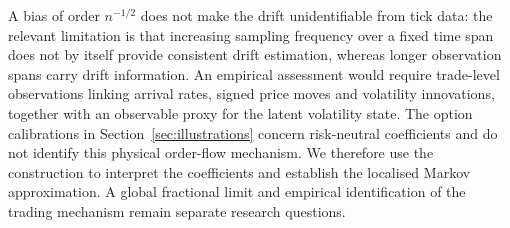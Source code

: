 \documentclass[11pt,a4paper]{article}
\theoremstyle{definition}
\begin{document}
A bias of order $n^{-1/2}$ does not make the drift unidentifiable from tick data: the relevant limitation is that increasing sampling frequency over a fixed time span does not by itself provide consistent drift estimation, whereas longer observation spans carry drift information. An empirical assessment would require trade-level observations linking arrival rates, signed price moves and volatility innovations, together with an observable proxy for the latent volatility state. The option calibrations in Section~\ref{sec:illustrations} concern risk-neutral coefficients and do not identify this physical order-flow mechanism. We therefore use the construction to interpret the coefficients and establish the localised Markov approximation. A global fractional limit and empirical identification of the trading mechanism remain separate research questions.
\end{document}
